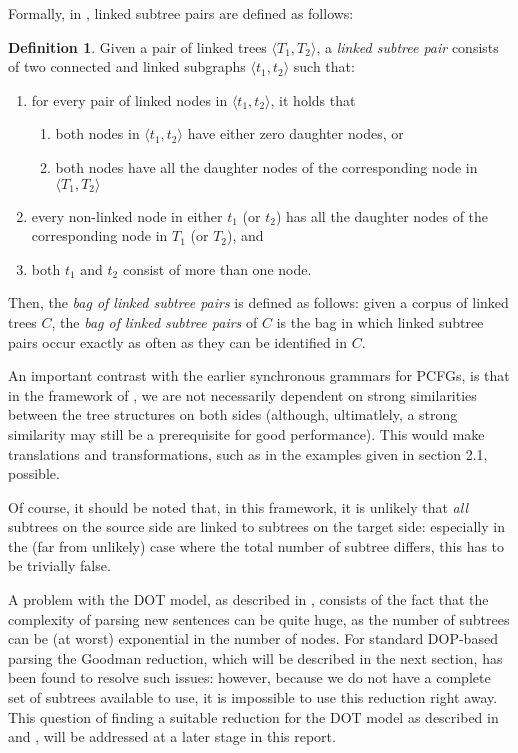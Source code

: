 \documentclass[a4paper]{article}
\theoremstyle{definition}
\newtheorem{definition}[theorem]{Definition}
\begin{document}
{{Formally, in \cite{Po}, linked subtree pairs are defined as follows:

\begin{definition}
Given a pair of linked trees $\langle T_1, T_2 \rangle$, a \emph{linked subtree
pair} consists of two connected and linked subgraphs $\langle t_1, t_2 \rangle$
such that:

\begin{enumerate}
\item for every pair of linked nodes in $\langle t_1, t_2 \rangle$, it holds that
	\begin{enumerate}
	\item both nodes in $\langle t_1, t_2 \rangle$ have either zero
		daughter nodes, or
	\item both nodes have all the daughter nodes of the corresponding node
		in $\langle T_1, T_2 \rangle$
	\end{enumerate}
\item every non-linked node in either $t_1$ (or $t_2$) has all the daughter
	nodes of the corresponding node in $T_1$ (or $T_2$), and
\item both $t_1$ and $t_2$ consist of more than one node.
\end{enumerate}
\end{definition}

Then, the \emph{bag of linked subtree pairs} is defined as follows: given a
corpus of linked trees $C$, the \emph{bag of linked subtree pairs} of $C$ is
the bag in which linked subtree pairs occur exactly as often as they can be
identified in $C$.

An important contrast with the earlier synchronous grammars for PCFGs, is that
in the framework of \cite{Po}, we are not necessarily dependent on strong
similarities between the tree structures on both sides (although, ultimatlely,
a strong similarity may still be a prerequisite for good performance). This
would make translations and transformations, such as in the examples given in
section 2.1, possible.

Of course, it should be noted that, in this framework, it is unlikely that
\emph{all} subtrees on the source side are linked to subtrees on the target
side: especially in the (far from unlikely) case where the total number of
subtree differs, this has to be trivially false.

A problem with the DOT model, as described in \cite{Po}, consists of the fact
that the complexity of parsing new sentences can be quite huge, as the number
of subtrees can be (at worst) exponential in the number of nodes. For standard
DOP-based parsing the Goodman reduction, which will be described in the next
section, has been found to resolve such issues: however, because we do not have
a complete set of subtrees available to use, it is impossible to use this
reduction right away. This question of finding a suitable reduction for the DOT
model as described in \cite{Po} and \cite{Po2}, will be addressed at a later
stage in this report.

}}
\end{document}
